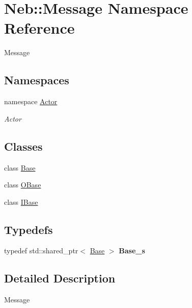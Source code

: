 \hypertarget{namespaceNeb_1_1Message}{\section{\-Neb\-:\-:\-Message \-Namespace \-Reference}
\label{namespaceNeb_1_1Message}
}


\-Message  


\subsection*{\-Namespaces}
\begin{DoxyCompactItemize}
\item 
namespace \hyperlink{namespaceNeb_1_1Message_1_1Actor}{\-Actor}
\begin{DoxyCompactList}\small\item\em \-Actor \end{DoxyCompactList}\end{DoxyCompactItemize}
\subsection*{\-Classes}
\begin{DoxyCompactItemize}
\item 
class \hyperlink{classNeb_1_1Message_1_1Base}{\-Base}
\item 
class \hyperlink{classNeb_1_1Message_1_1OBase}{\-O\-Base}
\item 
class \hyperlink{classNeb_1_1Message_1_1IBase}{\-I\-Base}
\end{DoxyCompactItemize}
\subsection*{\-Typedefs}
\begin{DoxyCompactItemize}
\item 
\hypertarget{namespaceNeb_1_1Message_a790a36ad380408033e76d4f70ee4a229}{typedef std\-::shared\-\_\-ptr$<$ \hyperlink{classNeb_1_1Message_1_1Base}{\-Base} $>$ {\bfseries \-Base\-\_\-s}}\label{namespaceNeb_1_1Message_a790a36ad380408033e76d4f70ee4a229}

\end{DoxyCompactItemize}


\subsection{\-Detailed \-Description}
\-Message 
